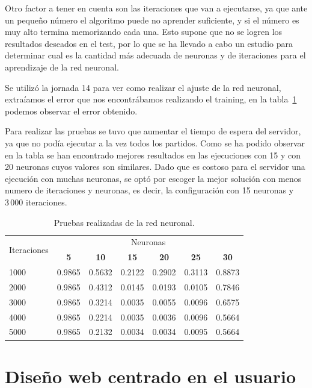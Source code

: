 Otro factor a tener en cuenta son las iteraciones que van a ejecutarse, ya que ante un pequeño número el algoritmo puede no aprender suficiente, y si el número es muy alto termina memorizando cada una. Esto supone que no se logren los resultados deseados en el test, por lo que se ha llevado a cabo un estudio para determinar cual es la cantidad más adecuada de neuronas y de iteraciones para el aprendizaje de la red neuronal.

Se utilizó la jornada 14 para ver como realizar el ajuste de la red neuronal, extraíamos el error que nos encontrábamos realizando el training, en la tabla~\ref{tabla:pruebas_red} podemos observar el error obtenido.

Para realizar las pruebas se tuvo que aumentar el tiempo de espera del servidor, ya que no podía ejecutar a la vez todos los partidos. Como se ha podido observar en la tabla se han encontrado mejores resultados en las ejecuciones con 15 y con 20 neuronas cuyos valores son similares. Dado que es costoso para el servidor una ejecución con muchas neuronas, se optó por escoger la mejor solución con menos numero de iteraciones y neuronas, es decir, la configuración con 15 neuronas y $3\,000$ iteraciones.


  \begin{table}
  \begin{center}
   \begin{tabular}{l c c c c c c}
    \toprule
    \multirow{2}{*}{Iteraciones}            & \multicolumn{6}{c}{Neuronas} \\ \cmidrule{2-7}
   	& \textbf{5} & \textbf{10} & \textbf{15} & \textbf{20} & \textbf{25} & \textbf{30}\\  \midrule 	
    1000 & 0.9865 & 0.5632 & 0.2122 & 0.2902 & 0.3113 & 0.8873\\    
    2000 & 0.9865 & 0.4312 & 0.0145	& 0.0193 & 0.0105 & 0.7846\\    
    3000 & 0.9865 & 0.3214 & 0.0035 & 0.0055 & 0.0096 & 0.6575\\    
    4000 & 0.9865 & 0.2214 & 0.0035 & 0.0036 & 0.0096 & 0.5664\\
	5000 & 0.9865 & 0.2132 & 0.0034 & 0.0034 & 0.0095 & 0.5664\\
	\bottomrule
   \end{tabular}
   \caption{Pruebas realizadas de la red neuronal.}
   \label{tabla:pruebas_red}
  \end{center}
 \end{table} 


\section{Diseño web centrado en el usuario}

